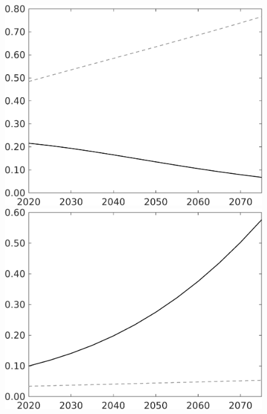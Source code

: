 \documentclass[12pt]{article}
\begin{document}
\begin{figure}[h!!]
\begin{minipage}[]{0.32\textwidth}
\end{minipage}	
\begin{minipage}[]{0.32\textwidth}
\includegraphics[width=1\textwidth]{../../codding_model/own_basedOnFried/optimalPol_010922_revision/figures/all_13Sept22/LevTaufNoTauf_TaulCalib_Equlab_regime0_F_spillover0_nsk1_xgr1_knspil1_sep1_LFlimit0_emsbase0_countec0_GovRev0_etaa0.79_lgd0.png}
\end{minipage}	
\begin{minipage}[]{0.32\textwidth}
\includegraphics[width=1\textwidth]{../../codding_model/own_basedOnFried/optimalPol_010922_revision/figures/all_13Sept22/LevTaufNoTauf_TaulCalib_Equlab_regime0_G_spillover0_nsk1_xgr1_knspil1_sep1_LFlimit0_emsbase0_countec0_GovRev0_etaa0.79_lgd0.png}

\end{minipage}
\end{figure}
\end{document}

